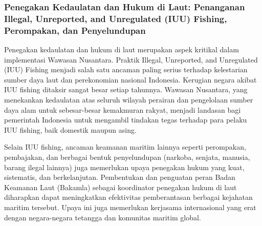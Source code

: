\documentclass[12pt, a4paper]{article}
\begin{document}
\subsubsection*{Penegakan Kedaulatan dan Hukum di Laut: Penanganan Illegal, Unreported, and Unregulated (IUU) Fishing, Perompakan, dan Penyelundupan}

Penegakan kedaulatan dan hukum di laut merupakan aspek kritikal dalam implementasi Wawasan Nusantara. Praktik Illegal, Unreported, and Unregulated (IUU) Fishing menjadi salah satu ancaman paling serius terhadap kelestarian sumber daya laut dan perekonomian nasional Indonesia. Kerugian negara akibat IUU fishing ditaksir sangat besar setiap tahunnya. Wawasan Nusantara, yang menekankan kedaulatan atas seluruh wilayah perairan dan pengelolaan sumber daya alam untuk sebesar-besar kemakmuran rakyat, menjadi landasan bagi pemerintah Indonesia untuk mengambil tindakan tegas terhadap para pelaku IUU fishing, baik domestik maupun asing.  

Selain IUU fishing, ancaman keamanan maritim lainnya seperti perompakan, pembajakan, dan berbagai bentuk penyelundupan (narkoba, senjata, manusia, barang ilegal lainnya) juga memerlukan upaya penegakan hukum yang kuat, sistematis, dan berkelanjutan. Pembentukan dan penguatan peran Badan Keamanan Laut (Bakamla) sebagai koordinator penegakan hukum di laut diharapkan dapat meningkatkan efektivitas pemberantasan berbagai kejahatan maritim tersebut. Upaya ini juga memerlukan kerjasama internasional yang erat dengan negara-negara tetangga dan komunitas maritim global.  
\end{document}
